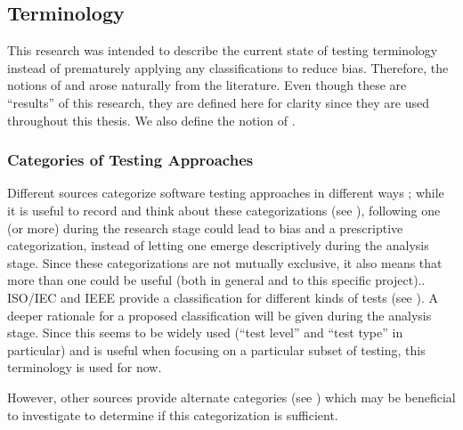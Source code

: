 \subsection{Terminology}

This research was intended to describe the current state of testing
terminology instead of prematurely applying any classifications to reduce bias.
Therefore, the notions of  and 
arose naturally from the literature. Even though these are ``results'' of this
research, they are defined here for clarity since they are used throughout this
thesis. We also define the notion of .

\subsubsection{Categories of Testing Approaches}
\label{categories-observ}

Different sources categorize software testing approaches in different ways%
\ifnotpaper
    ; while it is useful to record and think about these
    categorizations (see ), following one (or more)
    during the research
    stage could lead to bias and a prescriptive categorization, instead of letting
    one emerge descriptively during the analysis stage. Since these categorizations
    are not mutually exclusive, it also means that more than one could be useful
    (both in general and to this specific project).\newline \else.\fi\
\ifnotpaper \citet{IEEE2022} \else ISO/IEC and IEEE \cite{IEEE2022} \fi provide
a classification for different kinds of tests (see \refIEEETestTerms{}).
\ifnotpaper A deeper rationale for a proposed classification will be given
    during the analysis stage. \else Since
    this seems to be widely used (``test level'' and ``test type'' in particular)
    and is useful when focusing on a particular subset of testing, this terminology
    is used for now. \fi

\ifnotpaper
    However, other sources \citep{BarbosaEtAl2006, SouzaEtAl2017}
    provide alternate categories
    (see ) which may be beneficial to investigate to
    determine if this categorization is sufficient.

